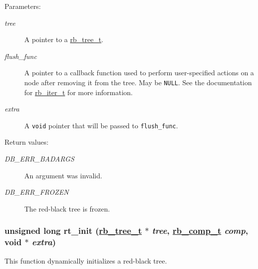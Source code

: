 \begin{Desc}
\item[Parameters:]
\begin{description}
\item[{\em tree}]A pointer to a \hyperlink{group__dbprim__rbtree_a0}{rb\_\-tree\_\-t}. \item[{\em flush\_\-func}]A pointer to a callback function used to perform user-specified actions on a node after removing it from the tree. May be {\tt NULL}. See the documentation for \hyperlink{group__dbprim__rbtree_a2}{rb\_\-iter\_\-t} for more information. \item[{\em extra}]A {\tt void} pointer that will be passed to {\tt flush\_\-func}.\end{description}
\end{Desc}
\begin{Desc}
\item[Return values:]
\begin{description}
\item[{\em DB\_\-ERR\_\-BADARGS}]An argument was invalid. \item[{\em DB\_\-ERR\_\-FROZEN}]The red-black tree is frozen. \end{description}
\end{Desc}
\hypertarget{group__dbprim__rbtree_a5}{
\subsubsection[rt\_\-init]{\setlength{\rightskip}{0pt plus 5cm}unsigned long rt\_\-init (\hyperlink{dbprim_8h_a0}{rb\_\-tree\_\-t} $\ast$ {\em tree}, \hyperlink{dbprim_8h_a3}{rb\_\-comp\_\-t} {\em comp}, void $\ast$ {\em extra})}}
\label{group__dbprim__rbtree_a5}


This function dynamically initializes a red-black tree.

